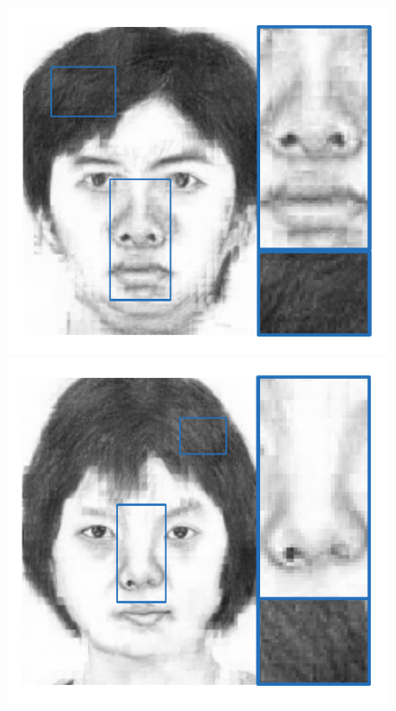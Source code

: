 \documentclass[10pt,twocolumn,letterpaper]{article}
\begin{document}
\begin{figure}[htbp]
\begin{minipage}[t]{0.138\linewidth}
\includegraphics[width=0.99\linewidth]{img/example1_MRF.pdf}
\includegraphics[width=0.99\linewidth]{img/example2_MRF.pdf}

\end{minipage}
\end{figure}
\end{document}
